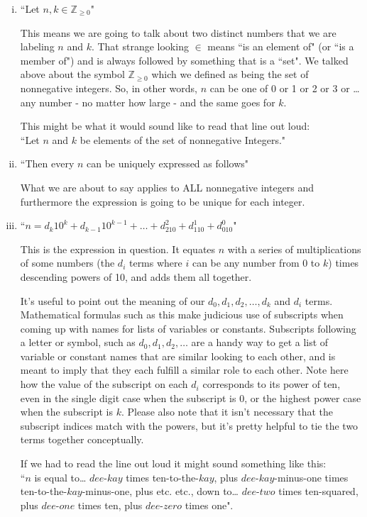 \documentclass{article}
\begin{document}
\begin{enumerate}[i)]
\item ``Let $n,k\in \mathbb{Z}_{\ge 0}$"

This means we are going to talk about two distinct numbers
that we are labeling $n$ and $k$.
That strange looking $\in$ means ``is an element of" (or ``is a member of")
and is always followed by something that is a ``set".
We talked above about the symbol $\mathbb{Z}_{\ge 0}$ which
we defined as being the set of nonnegative integers.
So, in other words, $n$ can be one of 0 or 1 or 2 or 3 or \dots{} 
any number - no matter how large - and the same goes for $k$.

This might be what it would sound like to read that line out loud:\\
``Let $n$ and $k$ be elements of the set of nonnegative Integers."

\item ``Then every $n$ can be uniquely expressed as follows"

What we are about to say applies to ALL nonnegative integers
and furthermore the expression is going to be unique for each integer.

\item ``$n=d_k10^k+d_{k-1}10^{k-1}+\dots+d_210^2+d_110^1+d_010^0$"

This is the expression in question. It equates $n$ with a series of multiplications
of some numbers (the $d_i$ terms where $i$ can be any
number from 0 to $k$) times descending powers of 10,
and adds them all together.

It's useful to point out the meaning of our $d_0,d_1,d_2,\dots{},d_k$ and $d_i$ terms.
Mathematical formulas such as this make judicious use of subscripts
when coming up with names for lists of variables or constants.
Subscripts following a letter or symbol, such as $d_0,d_1,d_2,\dots{}$
are a handy way to get a list of variable or constant names that are similar looking to each other,
and is meant to imply that they each fulfill a similar role to each other.
Note here how the value of the subscript on each $d_i$ corresponds to its power of ten,
even in the single digit case when the subscript is 0,
or the highest power case when the subscript is $k$. Please also note that it
isn't necessary that the subscript indices match with the powers, but it's pretty helpful
to tie the two terms together conceptually.

If we had to read the line out loud it might sound something like this:\\
``$n$ is equal to\dots{} $dee$-$kay$ times ten-to-the-$kay$,
plus $dee$-$kay$-minus-one times ten-to-the-$kay$-minus-one,
plus etc. etc., down to\dots{} $dee$-$two$ times ten-squared,
plus $dee$-$one$ times ten, plus $dee$-$zero$ times one".


\end{enumerate}
\end{document}
